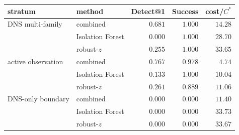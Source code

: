 \begin{tabular}{llrrr}
\toprule
stratum & method & Detect@1 & Success & cost/$C^\ast$ \\
\midrule
DNS multi-family & combined & $0.681$ & $1.000$ & $14.28$ \\
                 & Isolation Forest & $0.000$ & $1.000$ & $28.70$ \\
                 & robust-$z$ & $0.255$ & $1.000$ & $33.65$ \\
\midrule
active observation & combined & $0.767$ & $0.978$ & $4.74$ \\
                   & Isolation Forest & $0.133$ & $1.000$ & $10.04$ \\
                   & robust-$z$ & $0.261$ & $0.889$ & $11.06$ \\
\midrule
DNS-only boundary & combined & $0.000$ & $0.000$ & $11.40$ \\
                  & Isolation Forest & $0.000$ & $0.000$ & $33.73$ \\
                  & robust-$z$ & $0.000$ & $0.000$ & $33.67$ \\
\bottomrule
\end{tabular}
